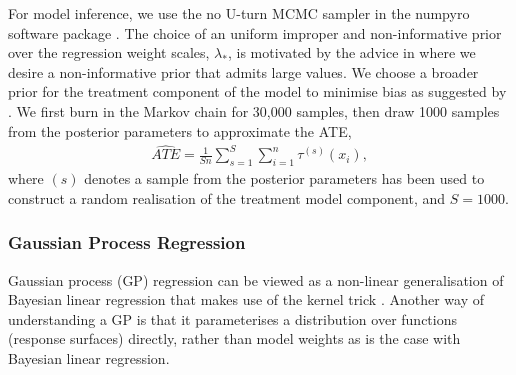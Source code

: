 \documentclass[12pt, a4paper]{article}
\begin{document}
For model inference, we use the no U-turn MCMC sampler \citep{hoffman2014} in
the numpyro software package \citep{bingham2019, phan2019}. The choice of an
uniform improper and non-informative prior over the regression weight scales,
$\lambda_*$, is motivated by the advice in \citet{gelman2006} where we desire a
non-informative prior that admits large values. We choose a broader 
prior for the treatment component of the model to minimise bias as suggested by
\cite{hahn2020}. We first burn in the Markov chain for 30,000 samples, then draw
1000 samples from the posterior parameters to approximate the ATE,
\begin{align}
  \hat{ATE} = \frac{1}{Sn} \sum^S_{s=1} \sum^n_{i=1} \tau^{(s)}(x_i),
  \label{eq:bayesATE}
\end{align}
where $(s)$ denotes a sample from the posterior parameters has been used to 
construct a random realisation of the treatment model component, and $S = 1000$.

\subsubsection*{Gaussian Process Regression}

Gaussian process (GP) regression can be viewed as a non-linear generalisation
of Bayesian linear regression that makes use of the kernel trick
\citep{williams2006, bishop2006}. Another way of understanding a GP is that it
parameterises a distribution over functions (response surfaces) directly,
rather than model weights as is the case with Bayesian linear regression.
\end{document}
